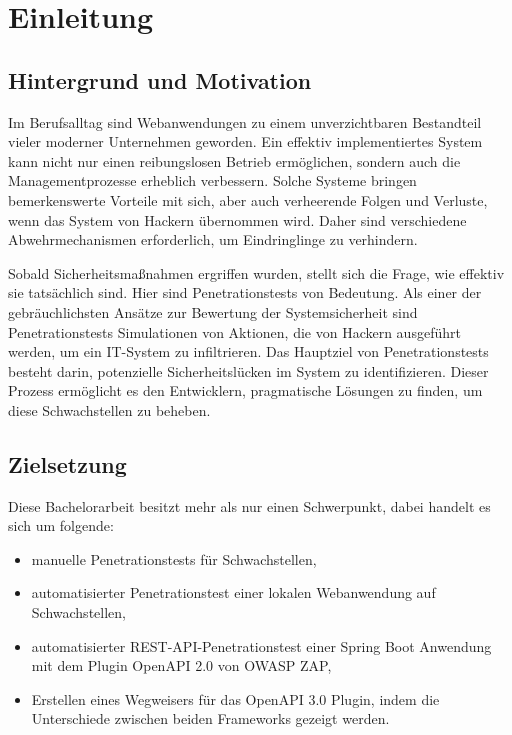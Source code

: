 \chapter{Einleitung}
\label{cha:Einleitung}

\section{Hintergrund und Motivation}

Im Berufsalltag sind Webanwendungen zu einem unverzichtbaren Bestandteil vieler moderner Unternehmen geworden. Ein effektiv implementiertes System kann nicht nur einen reibungslosen Betrieb ermöglichen, sondern auch die Managementprozesse erheblich verbessern. Solche Systeme bringen bemerkenswerte Vorteile mit sich, aber auch verheerende Folgen und Verluste, wenn das System von Hackern übernommen wird. Daher sind verschiedene Abwehrmechanismen erforderlich, um Eindringlinge zu verhindern.

Sobald Sicherheitsmaßnahmen ergriffen wurden, stellt sich die Frage, wie effektiv sie tatsächlich sind. Hier sind Penetrationstests von Bedeutung. Als einer der gebräuchlichsten Ansätze zur Bewertung der Systemsicherheit sind Penetrationstests Simulationen von Aktionen, die von Hackern ausgeführt werden, um ein IT-System zu infiltrieren. Das Hauptziel von Penetrationstests besteht darin, potenzielle Sicherheitslücken im System zu identifizieren. Dieser Prozess ermöglicht es den Entwicklern, pragmatische Lösungen zu finden, um diese Schwachstellen zu beheben.

\section{Zielsetzung}

Diese Bachelorarbeit besitzt mehr als nur einen Schwerpunkt, dabei handelt es sich um folgende:

\begin{itemize}
	\item manuelle Penetrationstests für Schwachstellen,
	\item automatisierter Penetrationstest einer lokalen Webanwendung auf Schwachstellen,
	\item automatisierter REST-API-Penetrationstest einer Spring Boot Anwendung mit dem Plugin OpenAPI 2.0 von OWASP ZAP,
	\item Erstellen eines Wegweisers für das OpenAPI 3.0 Plugin, indem die Unterschiede zwischen beiden Frameworks gezeigt werden.\\
\end{itemize}

